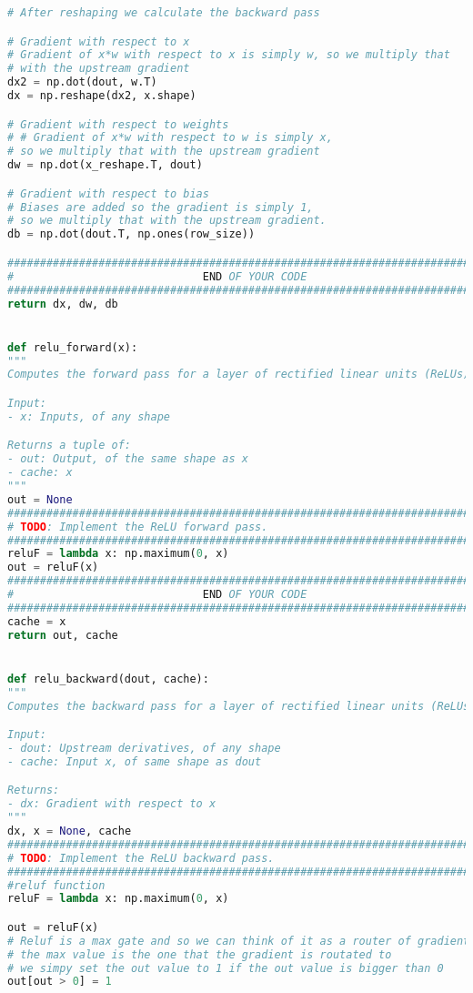 \begin{lstlisting}[language=Python, label=lst:layers.py, caption={layers.py}, basicstyle=\tiny]
# After reshaping we calculate the backward pass

# Gradient with respect to x
# Gradient of x*w with respect to x is simply w, so we multiply that 
# with the upstream gradient
dx2 = np.dot(dout, w.T) 
dx = np.reshape(dx2, x.shape)

# Gradient with respect to weights
# # Gradient of x*w with respect to w is simply x, 
# so we multiply that with the upstream gradient
dw = np.dot(x_reshape.T, dout)

# Gradient with respect to bias
# Biases are added so the gradient is simply 1, 
# so we multiply that with the upstream gradient.
db = np.dot(dout.T, np.ones(row_size))

#############################################################################
#                             END OF YOUR CODE                              #
#############################################################################
return dx, dw, db


def relu_forward(x):
"""
Computes the forward pass for a layer of rectified linear units (ReLUs).

Input:
- x: Inputs, of any shape

Returns a tuple of:
- out: Output, of the same shape as x
- cache: x
"""
out = None
#############################################################################
# TODO: Implement the ReLU forward pass.                                    #
#############################################################################
reluF = lambda x: np.maximum(0, x)
out = reluF(x)
#############################################################################
#                             END OF YOUR CODE                              #
#############################################################################
cache = x
return out, cache


def relu_backward(dout, cache):
"""
Computes the backward pass for a layer of rectified linear units (ReLUs).

Input:
- dout: Upstream derivatives, of any shape
- cache: Input x, of same shape as dout

Returns:
- dx: Gradient with respect to x
"""
dx, x = None, cache
#############################################################################
# TODO: Implement the ReLU backward pass.                                   #
#############################################################################
#reluf function
reluF = lambda x: np.maximum(0, x)

out = reluF(x)
# Reluf is a max gate and so we can think of it as a router of gradients
# the max value is the one that the gradient is routated to
# we simpy set the out value to 1 if the out value is bigger than 0
out[out > 0] = 1


\end{lstlisting}
